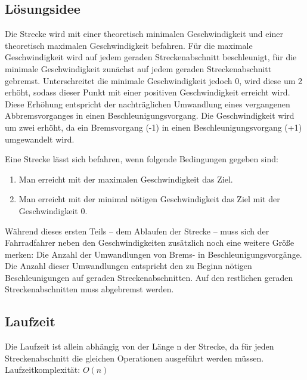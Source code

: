 \subsection {Lösungsidee}
	Die Strecke wird mit einer theoretisch minimalen Geschwindigkeit und einer theoretisch maximalen Geschwindigkeit befahren. 
	Für die maximale Geschwindigkeit wird auf jedem geraden Streckenabschnitt beschleunigt, für die minimale Geschwindigkeit zunächst auf
	jedem geraden Streckenabschnitt gebremst. Unterschreitet die minimale Geschwindigkeit jedoch 0, wird diese um 2 erhöht, sodass dieser Punkt mit einer positiven Geschwindigkeit erreicht wird.
	Diese Erhöhung entspricht der nachträglichen Umwandlung eines vergangenen Abbremsvorganges in einen Beschleunigungsvorgang. Die Geschwindigkeit wird um zwei erhöht, da ein Bremsvorgang (-1) in einen Beschleunigungsvorgang (+1) umgewandelt wird.
	
	Eine Strecke lässt sich befahren, wenn folgende Bedingungen gegeben sind:
	\begin{enumerate}
		\item Man erreicht mit der maximalen Geschwindigkeit das Ziel.
		\item Man erreicht mit der minimal nötigen Geschwindigkeit das Ziel mit der Geschwindigkeit 0.
	\end{enumerate}

	Während dieses ersten Teils – dem Ablaufen der Strecke – muss sich der Fahrradfahrer neben den Geschwindigkeiten zusätzlich noch
	eine weitere Größe merken: Die Anzahl der Umwandlungen von Brems- in Beschleunigungsvorgänge. Die Anzahl dieser Umwandlungen entspricht
	den zu Beginn nötigen Beschleunigungen auf geraden Streckenabschnitten. Auf den restlichen geraden Streckenabschnitten muss abgebremst werden.
\subsection{Laufzeit}
	Die Laufzeit ist allein abhängig von der Länge n der Strecke, da für jeden Streckenabschnitt die gleichen Operationen ausgeführt werden müssen. Laufzeitkomplexität: \(O(n)\)
